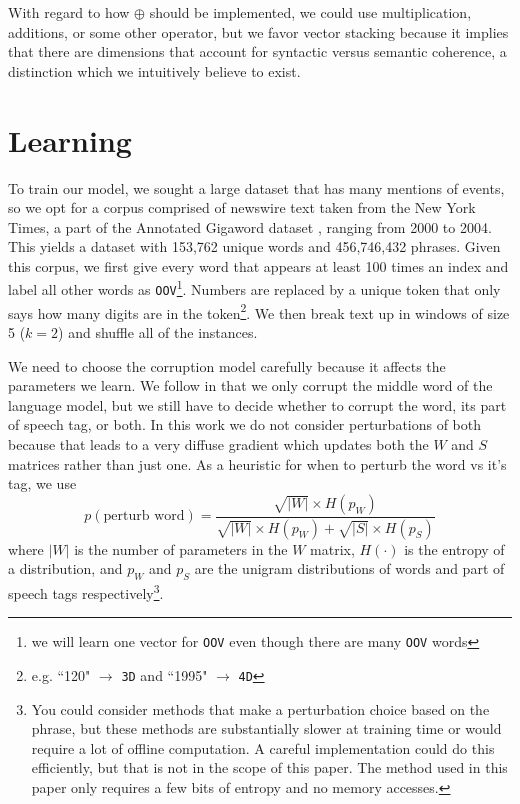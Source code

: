 \documentclass[11pt,letterpaper]{article}
\begin{document}
With regard to how $\oplus$ should be implemented, we could use multiplication,
additions, or some other operator, but we favor vector stacking because it
implies that there are dimensions that account for syntactic versus semantic
coherence, a distinction which we intuitively believe to exist.



\section{Learning} %
To train our model, we sought a large dataset that has many mentions of events,
so we opt for a corpus comprised of newswire text taken from the New York Times,
a part of the Annotated Gigaword dataset \cite{agiga}, ranging from 2000 to 2004.
This yields a dataset with 153,762 unique words and 456,746,432 phrases.
Given this corpus, we first give every word that appears at least 100
times an index and label all other words as \texttt{OOV}\footnote{we will learn
one vector for \texttt{OOV} even though there are many \texttt{OOV} words}.
Numbers are replaced by a unique token that only says how many digits are in
the token\footnote{e.g. ``120" $\rightarrow$ \texttt{3D} and ``1995" $\rightarrow$ \texttt{4D}}.
We then break text up in windows of size 5 ($k=2$) and shuffle all of the instances.

We need to choose the corruption model carefully because it affects the parameters we learn.
We follow \cite{rami} in that we only corrupt the middle word of the language model,
but we still have to decide whether to corrupt the word, its part of speech tag, or both.
In this work we do not consider perturbations of both because that leads to a very
diffuse gradient which updates both the $W$ and $S$ matrices rather than just one.
As a heuristic for when to perturb the word vs it's tag, we use
\[
	p(\mbox{perturb word}) = \frac
		{\sqrt{|W|} \times H(p_W)}
	{\sqrt{|W|} \times H(p_W) + \sqrt{|S|} \times H(p_S)}
\]
where $|W|$ is the number of parameters in the $W$ matrix, $H(\cdot)$ is
the entropy of a distribution, and $p_W$ and $p_S$ are the unigram distributions
of words and part of speech tags respectively\footnote{You could consider methods
that make a perturbation choice based on the phrase, but these methods are
substantially slower at training time or would require a lot of offline computation.
A careful implementation could do this efficiently, but that is not in the scope of this paper.
The method used in this paper only requires a few bits of entropy and no memory accesses.}.
\end{document}
